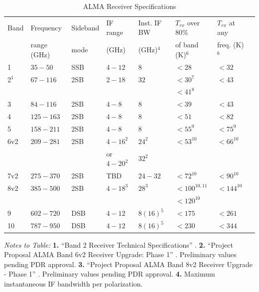 \begin{table}[h!]
    \centering
    \caption{ALMA Receiver Specifications}
    \label{tab:rx_summary}
    \begin{tabular}{llllllll}
        \hline
        Band & Frequency & Sideband & IF range & Inst. IF BW & $T_{rx}$ over 80\% & $T_{rx}$ at any\\
        & range (GHz) & mode & (GHz) & (GHz)$^4$ & of band (K)$^6$ & freq. (K)$^6$\\
        \hline
        1 & $35-50$ &  \acs{SSB} & $4-12$ & $8$ & $<28$ & $<32$\\
        2$^1$ & $67-116$ & \acs{2SB} & $2-18$ & $32$ & $<30^7$ & $<43$\\
        & & & & & $<41^8$ &\\
        3 & $84-116$ & \acs{2SB} & $4-8$ & $8$ & $<39$ & $<43$\\
        4 & $125-163$ & \acs{2SB} & $4-8$ & $8$ & $<51$ & $<82$\\
        5 & $158-211$ & \acs{2SB} & $4-8$ & $8$ & $<55^{9}$ & $<75^{9}$\\
        6v2 & $209-281$ & \acs{2SB} & $4-16^2$ & $24^2$ & $<53^{10}$ & $<66^{10}$\\
        & & & or $4-20^2$ & $32^2$ & & \\
        7v2 & $275-370$ & \acs{2SB} & TBD & $24-32$ & $<72^{10}$ & $<90^{10}$\\
        8v2 & $385-500$ & \acs{2SB} & $4-18^3$ & $28^3$ & $<100^{10,11} $ & $<144^{10}$\\
        & & & & & $<120^{10}$ & \\        
        9 & $602-720$ & \acs{DSB} & $4-12$ & $8(16)^5$ & $<175$ & $<261$\\
        10 & $787-950$ & \acs{DSB} & $4-12$ & $8(16)^5$ & $<230$ & $<344$\\
        \hline
    \end{tabular}
    \begin{minipage}{\textwidth}
    \small
    \vspace*{0.5em}
    \textit{Notes to Table:}     
        \textbf{1.} ``Band 2 Receiver Technical Specifications'' \cite{band2_spe}. 
        \textbf{2.} ``Project Proposal ALMA Band 6v2 Receiver Upgrade: Phase 1'' \cite{band6v2_pp}. Preliminary values pending PDR approval.
        \textbf{3.} ``Project Proposal ALMA Band 8v2 Receiver Upgrade - Phase 1'' \cite{band8v2_pp}. Preliminary values pending PDR approval.
        \textbf{4.} Maximum instantaneous IF bandwidth per polarization.

\end{minipage}
\end{table}
